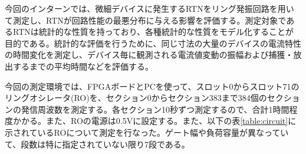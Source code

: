 \documentclass{jsarticle}
\begin{document}
今回のインターンでは、微細デバイスに発生するRTNをリング発振回路を用いて測定し、RTNが回路性能の最悪分布に与える影響を評価する。測定対象であるRTNは統計的な性質を持っており、各種統計的な性質をモデル化することが目的である。統計的な評価を行うために、同じ寸法の大量のデバイスの電流特性の時間変化を測定し、デバイス毎に観測される電流値変動の振幅および捕獲・放出するまでの平均時間などを評価する。

今回の測定環境では、FPGAボードとPCを使って、スロット0からスロット71のリングオシレータ(RO)を、セクション0からセクション383まで384個のセクションの発信周波数を測定する。各セクション10秒ずつ測定するので、合計1時間程度かかる。また、ROの電源は0.5Vに設定する。また、以下の表\ref{table:circuit}に示されているROについて測定を行なった。ゲート幅や負荷容量が異なっていて、段数は特に指定されていない限り7段である。
\end{document}
